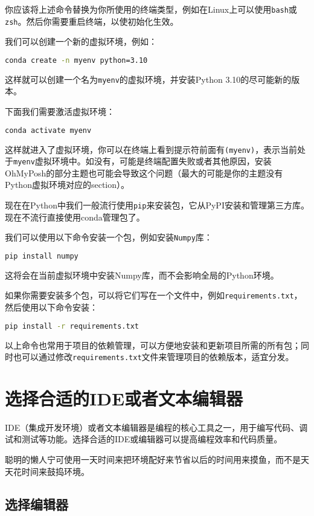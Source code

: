 \documentclass[../main.tex]{subfiles}
\begin{document}
你应该将上述命令替换为你所使用的终端类型，例如在Linux上可以使用\texttt{bash}或\texttt{zsh}。然后你需要重启终端，以使初始化生效。

我们可以创建一个新的虚拟环境，例如：
\begin{lstlisting}[language=bash]
    conda create -n myenv python=3.10
\end{lstlisting}
这样就可以创建一个名为\texttt{myenv}的虚拟环境，并安装Python 3.10的尽可能新的版本。

下面我们需要激活虚拟环境：
\begin{lstlisting}[language=bash]
    conda activate myenv
\end{lstlisting}
这样就进入了虚拟环境，你可以在终端上看到提示符前面有\texttt{(myenv)}，表示当前处于\texttt{myenv}虚拟环境中。如没有，可能是终端配置失败或者其他原因，安装OhMyPosh的部分主题也可能会导致这个问题（最大的可能是你的主题没有Python虚拟环境对应的section）。

现在在Python中我们一般流行使用\texttt{pip}来安装包，它从PyPI安装和管理第三方库。现在不流行直接使用conda管理包了。

我们可以使用以下命令安装一个包，例如安装\texttt{Numpy}库：
\begin{lstlisting}[language=bash]
    pip install numpy
\end{lstlisting}
这将会在当前虚拟环境中安装Numpy库，而不会影响全局的Python环境。

如果你需要安装多个包，可以将它们写在一个文件中，例如\texttt{requirements.txt}，然后使用以下命令安装：
\begin{lstlisting}[language=bash]
    pip install -r requirements.txt
\end{lstlisting}
以上命令也常用于项目的依赖管理，可以方便地安装和更新项目所需的所有包；同时也可以通过修改\texttt{requirements.txt}文件来管理项目的依赖版本，适宜分发。

\section{选择合适的IDE或者文本编辑器}

IDE（集成开发环境）或者文本编辑器是编程的核心工具之一，用于编写代码、调试和测试等功能。选择合适的IDE或编辑器可以提高编程效率和代码质量。

聪明的懒人宁可使用一天时间来把环境配好来节省以后的时间用来摸鱼，而不是天天花时间来鼓捣环境。

\subsection{选择编辑器}
\end{document}
